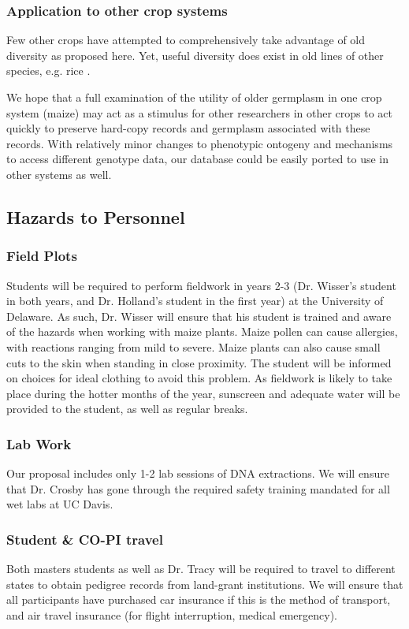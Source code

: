 \documentclass[12pt]{article}
\begin{document}
\subsubsection*{Application to other crop systems}
Few other crops have attempted to comprehensively take advantage of old diversity as proposed here.  
Yet, useful diversity does exist in old lines of other species, e.g. rice \citep{gamuyao2012protein}. 

We hope that a full examination of the utility of older germplasm in one crop system (maize) may act as a stimulus for other researchers in other crops to act quickly to preserve hard-copy records and germplasm associated with these records. 
With relatively minor changes to phenotypic ontogeny and mechanisms to access different genotype data, our database could be easily ported to use in other systems as well. 

\subsection*{Hazards to Personnel}

\subsubsection*{Field Plots}
Students will be required to perform fieldwork in years 2-3 (Dr. Wisser's student in both years, and Dr. Holland's student in the first year) at the University of Delaware. 
As such, Dr. Wisser will ensure that his student is trained and aware of the hazards when working with maize plants. 
Maize pollen can cause allergies, with reactions ranging from mild to severe. 
Maize plants can also cause small cuts to the skin when standing in close proximity. 
The student will be informed on choices for ideal clothing to avoid this problem. 
As fieldwork is likely to take place during the hotter months of the year, sunscreen and adequate water will be provided to the student, as well as regular breaks.

\subsubsection*{Lab Work}
Our proposal includes only 1-2 lab sessions of DNA extractions. 
We will ensure that Dr. Crosby has gone through the required safety training mandated for all wet labs at UC Davis.

\subsubsection*{Student \& CO-PI travel}
Both masters students as well as Dr. Tracy will be required to travel to different states to obtain pedigree records from land-grant institutions. 
We will ensure that all participants have purchased car insurance if this is the method of transport, and air travel insurance (for flight interruption, medical emergency).


\newpage

\end{document}

